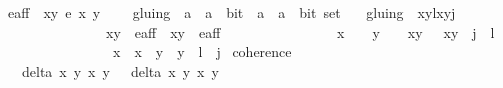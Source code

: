 \begin{isabellebody}
\ {\isachardoublequoteopen}e{\isacharprime}{\isacharunderscore}aff\ {\isacharequal}\ {\isacharbraceleft}{\isacharparenleft}x{\isacharcomma}y{\isacharparenright}{\isachardot}\ e{\isacharprime}\ x\ y\ {\isacharequal}\ {}{\isacharbraceright}{\isachardoublequoteclose}\ \isanewline
\isanewline
{}\isamarkupfalse%
\ gluing\ {\isacharcolon}{\isacharcolon}\ {\isachardoublequoteopen}{\isacharparenleft}{\isacharparenleft}{\isacharparenleft}{\isacharprime}a\ {\isasymtimes}\ {\isacharprime}a{\isacharparenright}\ {\isasymtimes}\ bit{\isacharparenright}\ {\isasymtimes}\ {\isacharparenleft}{\isacharparenleft}{\isacharprime}a\ {\isasymtimes}\ {\isacharprime}a{\isacharparenright}\ {\isasymtimes}\ bit{\isacharparenright}{\isacharparenright}\ set{\isachardoublequoteclose}\ \isanewline
\ \ {\isachardoublequoteopen}gluing\ {\isacharequal}\ {\isacharbraceleft}{\isacharparenleft}{\isacharparenleft}{\isacharparenleft}x{}{\isacharcomma}y{}{\isacharparenright}{\isacharcomma}l{\isacharparenright}{\isacharcomma}{\isacharparenleft}{\isacharparenleft}x{}{\isacharcomma}y{}{\isacharparenright}{\isacharcomma}j{\isacharparenright}{\isacharparenright}{\isachardot}\ \isanewline
\ \ \ \ \ \ \ \ \ \ \ \ \ \ \ {\isacharparenleft}{\isacharparenleft}x{}{\isacharcomma}y{}{\isacharparenright}\ {\isasymin}\ e{\isacharprime}{\isacharunderscore}aff\ {\isasymand}\ {\isacharparenleft}x{}{\isacharcomma}y{}{\isacharparenright}\ {\isasymin}\ e{\isacharprime}{\isacharunderscore}aff{\isacharparenright}\ {\isasymand}\isanewline
\ \ \ \ \ \ \ \ \ \ \ \ \ \ \ {\isacharparenleft}{\isacharparenleft}x{}\ {\isasymnoteq}\ {}\ {\isasymand}\ y{}\ {\isasymnoteq}\ {}\ {\isasymand}\ {\isacharparenleft}x{}{\isacharcomma}y{}{\isacharparenright}\ {\isacharequal}\ {\isasymtau}\ {\isacharparenleft}x{}{\isacharcomma}y{}{\isacharparenright}\ {\isasymand}\ j\ {\isacharequal}\ l{\isacharplus}{}{\isacharparenright}\ {\isasymor}\isanewline
\ \ \ \ \ \ \ \ \ \ \ \ \ \ \ \ {\isacharparenleft}x{}\ {\isacharequal}\ x{}\ {\isasymand}\ y{}\ {\isacharequal}\ y{}\ {\isasymand}\ l\ {\isacharequal}\ j{\isacharparenright}{\isacharparenright}{\isacharbraceright}{\isachardoublequoteclose}\isanewline
\isanewline
\isanewline
{}\isamarkupfalse%
\ coherence{\isacharcolon}\isanewline
\ \ \ {\isachardoublequoteopen}delta\ x{}\ y{}\ x{}\ y{}\ {\isasymnoteq}\ {}{\isachardoublequoteclose}\ {\isachardoublequoteopen}delta{\isacharprime}\ x{}\ y{}\ x{}\ y{}\ {\isasymnoteq}\ {}{\isachardoublequoteclose}\ \isanewline

\end{isabellebody}
